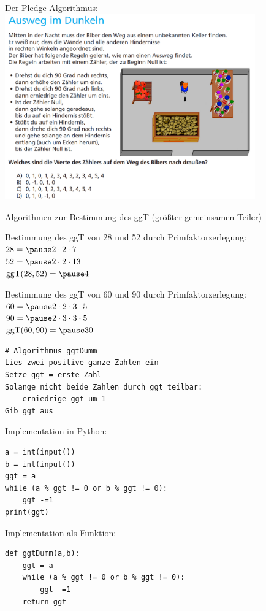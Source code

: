 \documentclass[10pt]{beamer}
\begin{document}
\begin{frame}[fragile]
Der Pledge-Algorithmus:
\includegraphics[height=8cm]{bild1.png}
\end{frame}

\begin{frame}[fragile]
Algorithmen zur Bestimmung des ggT (größter gemeinsamen Teiler)

Bestimmung des ggT von 28 und 52 durch Primfaktorzerlegung: \\
$28 =\pause 2 \cdot 2 \cdot 7$ \\
$52 =\pause 2 \cdot 2 \cdot 13$  \\
$\text{ggT}(28,52) = \pause4$

Bestimmung des ggT von 60 und 90 durch Primfaktorzerlegung: \\
$60 =\pause 2 \cdot 2 \cdot 3 \cdot 5$ \\
$90 =\pause 2 \cdot 3 \cdot 3 \cdot 5$ \\
$\text{ggT}(60,90) = \pause30$
\end{frame}

\begin{frame}[fragile]

\begin{lstlisting} 
# Algorithmus ggtDumm
Lies zwei positive ganze Zahlen ein
Setze ggt = erste Zahl
Solange nicht beide Zahlen durch ggt teilbar:
	erniedrige ggt um 1
Gib ggt aus
\end{lstlisting}   \pause
Implementation in Python:  \pause

\begin{lstlisting} 
a = int(input())
b = int(input())
ggt = a
while (a % ggt != 0 or b % ggt != 0):
    ggt -=1
print(ggt)
\end{lstlisting} 

Implementation als Funktion:  \pause
\begin{lstlisting} 
def ggtDumm(a,b):
    ggt = a
    while (a % ggt != 0 or b % ggt != 0):
        ggt -=1
    return ggt
\end{lstlisting} 
\end{frame}
\end{document}
